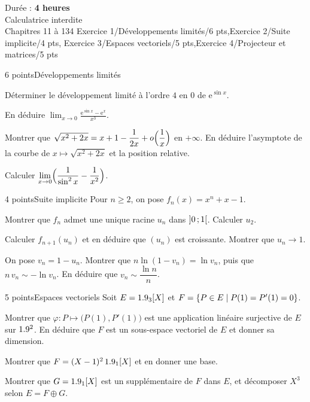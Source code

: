 
  {Durée : \textbf{4 heures}\\Calculatrice interdite\\Chapitres 11 à 13}{4}
  {Exercice 1/Développements limités/6 pts,Exercice 2/Suite implicite/4 pts,%
   Exercice 3/Espaces vectoriels/5 pts,Exercice 4/Projecteur et matrices/5 pts}

\begin{exoEval}{6 points}{Développements limités}
\begin{questions}
  \item Déterminer le développement limité à l'ordre $4$ en $0$ de
    $\mathrm{e}^{\sin x}$.
  \item En déduire $\displaystyle\lim_{x\to0}\frac{\mathrm{e}^{\sin x}-\mathrm{e}^{x}}{x^{3}}$.
  \item Montrer que $\sqrt{x^{2}+2x}=x+1-\dfrac{1}{2x}+o\Bigl(\dfrac1x\Bigr)$
    en $+\infty$. En déduire l'asymptote de la courbe de
    $x\mapsto\sqrt{x^{2}+2x}$ et la position relative.
  \item Calculer
    $\displaystyle\lim_{x\to0}\Bigl(\frac{1}{\sin^{2}x}-\frac{1}{x^{2}}\Bigr)$.
\end{questions}
\end{exoEval}

\begin{exoEval}{4 points}{Suite implicite}
Pour $n\geqslant2$, on pose $f_n(x)=x^{n}+x-1$.
\begin{questions}
  \item Montrer que $f_n$ admet une unique racine $u_n$ dans $\mathopen{]}0\,{;}\,1\mathclose{[}$.
    Calculer $u_2$.
  \item Calculer $f_{n+1}(u_n)$ et en déduire que $(u_n)$ est croissante.
    Montrer que $u_n\to1$.
  \item On pose $v_n=1-u_n$. Montrer que $n\ln(1-v_n)=\ln v_n$, puis que
    $n\,v_n\sim-\ln v_n$. En déduire que $v_n\sim\dfrac{\ln n}{n}$.
\end{questions}
\end{exoEval}

\begin{exoEval}{5 points}{Espaces vectoriels}
Soit $E=1.9_3[X]$ et $F=\left\{P\in E\mid P(1)=P'(1)=0\right\}$.
\begin{questions}
  \item Montrer que $\varphi:P\mapsto\bigl(P(1),P'(1)\bigr)$ est une
    application linéaire surjective de $E$ sur $1.9^{2}$. En déduire que $F$
    est un sous-espace vectoriel de $E$ et donner sa dimension.
  \item Montrer que $F=(X-1)^{2}\,1.9_1[X]$ et en donner une base.
  \item Montrer que $G=1.9_1[X]$ est un supplémentaire de $F$ dans $E$, et
    décomposer $X^{3}$ selon $E=F\oplus G$.
\end{questions}
\end{exoEval}

